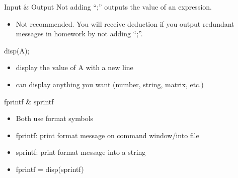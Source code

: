 \begin{frame}{Input \& Output}
Not adding ``;'' outputs the value of an expression.
\begin{itemize}
\item Not recommended. You will receive deduction if you output redundant messages in homework by not adding ``;''.
\end{itemize}
disp(A);
\begin{itemize}
\item display the value of A with a new line
\item can display anything you want (number, string, matrix, etc.)
\end{itemize}
fprintf \& sprintf
\begin{itemize}
\item Both use format symbols
\item fprintf: print format message on command window/into file
\item sprintf: print format message into a string
\item fprintf = disp(sprintf)
\end{itemize}
\end{frame}